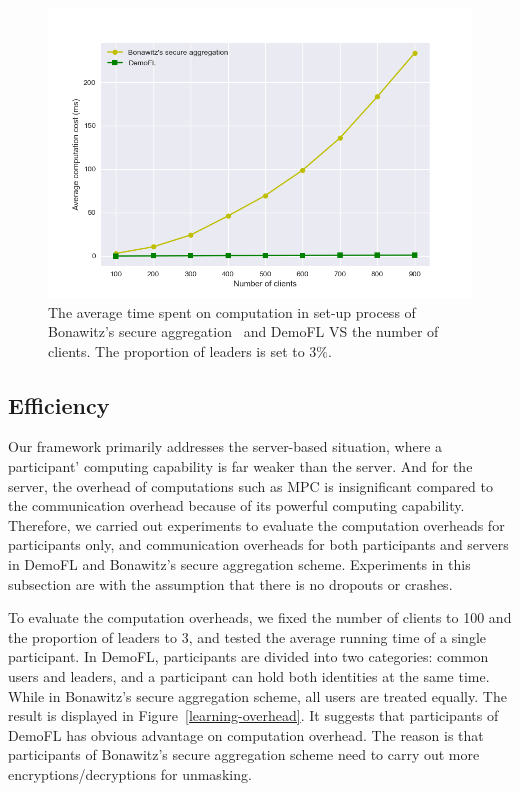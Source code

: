 \begin{figure}[!ht]
    \centering
    \includegraphics[width=\columnwidth]{img/avg-user-cpu.png}
    \caption{The average time spent on computation in set-up process of Bonawitz's secure aggregation~\cite{Practical} and DemoFL VS the number of clients. The proportion of leaders is set to $3\%$.}
    \label{avg-user-cpu}
\end{figure}

\subsection{Efficiency}
Our framework primarily addresses the server-based situation, where a participant' computing capability is far weaker than the server. And for the server, the overhead of computations such as MPC is insignificant compared to the communication overhead because of its powerful computing capability. Therefore, we carried out experiments to evaluate the computation overheads for participants only, and communication overheads for both participants and servers in DemoFL and Bonawitz's secure aggregation scheme. Experiments in this subsection are with the assumption that there is no dropouts or crashes.

To evaluate the computation overheads, we fixed the number of clients to 100 and the proportion of leaders to $3$, and tested the average running time of a single participant. In DemoFL, participants are divided into two categories: common users and leaders, and a participant can hold both identities at the same time. While in Bonawitz's secure aggregation scheme, all users are treated equally. The result is displayed in Figure~\ref{learning-overhead}. It suggests that participants of DemoFL has obvious advantage on computation overhead. The reason is that participants of Bonawitz's secure aggregation scheme need to carry out more encryptions/decryptions for unmasking.

